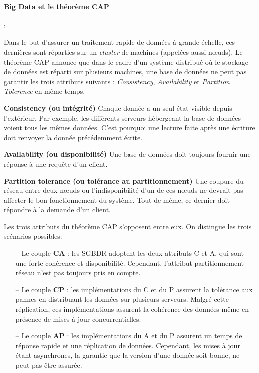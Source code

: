 		\paragraph{Big Data et le théorème  CAP} \label{par:cap-theorem}:
		
		Dans le but d'assurer un traitement rapide de données à grande échelle, ces dernières sont réparties sur un \textit{cluster} de machines  (appelées aussi  n\oe{}uds). Le théorème CAP annonce que dans le cadre d'un système distribué où le stockage de données est  réparti sur plusieurs machines,
		une base de données ne peut pas garantir les trois attributs suivants : \textit{Consistency}, \textit{Availability} et \textit{Partition Tolerence}  en même temps. \par
			\textbf{Consistency (ou intégrité)} Chaque donnée a un seul état visible depuis l'extérieur. Par exemple, les différents serveurs hébergeant la base de données voient tous les mêmes données. C'est pourquoi une lecture faite après une écriture doit renvoyer la donnée précédemment écrite. \par
			\textbf{Availability (ou disponibilité)} Une base de données doit toujours fournir une réponse à une requête d'un client.\par
			 \textbf{Partition tolerance (ou  tolérance au partitionnement) } Une coupure du réseau entre deux n\oe{}uds ou l'indisponibilité d'un de ces n\oe{}uds ne devrait pas affecter le bon fonctionnement du système. Tout de même,  ce dernier doit répondre à la demande d'un client. 

		
		Les trois attributs du théorème CAP s'opposent entre eux. On distingue les trois scénarios possibles:
		
		\begin{itemize}
			\item [--] Le couple \textbf{CA} : les SGBDR adoptent les deux attributs C et A, qui sont une forte cohérence et disponibilité. Cependant, l'attribut partitionnement réseau n'est pas toujours pris en compte.
			\item [--] Le couple \textbf{CP} : les implémentations du C et du P assurent la tolérance aux pannes en distribuant les données sur plusieurs serveurs. Malgré cette réplication, ces implémentations assurent la cohérence des données même en présence de mises à jour concurrentielles.
			\item [--] Le couple \textbf{AP} : les implémentations du A et du  P assurent un temps de réponse rapide et une réplication de données. Cependant, les mises à jour étant asynchrones, la garantie que la version d'une donnée soit bonne, ne peut pas être assurée.
			
		\end{itemize}
		
